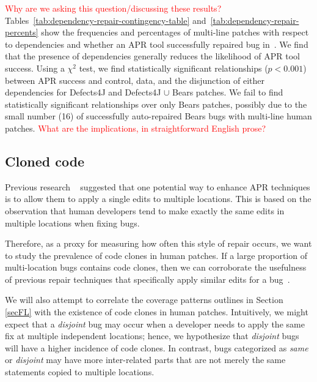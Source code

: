 \documentclass[sigconf, timestamp-false, anonymous=true]{acmart}
\newcommand\todo[1]{\textcolor{red}{#1}}
\begin{document}
\todo{Why are we asking this question/discussing these results?} 
Tables~\ref{tab:dependency-repair-contingency-table} and~\ref{tab:dependency-repair-percents}
show the frequencies and percentages of multi-line patches with respect to dependencies 
and whether an APR tool successfully repaired bug in~\cite{durieux-repair-them-all}.
We find that the presence of dependencies generally reduces the likelihood of APR tool success.
Using a $\chi^2$ test, we find statistically significant relationships ($p < 0.001$)
between APR success and control, data, and the disjunction of either dependencies 
for Defects4J and Defects4J $\cup$ Bears patches. We fail to find statistically 
significant relationships over only Bears patches, possibly due to the small number (16) of 
successfully auto-repaired Bears bugs with multi-line human patches.
\todo{What are the implications, in straightforward English prose?}


\subsection{Cloned code}


Previous research ~\cite{wang2018} suggested that one potential way to enhance
APR techniques is to allow them to apply a single edits to multiple locations.
This is based on the observation that human developers tend to make exactly the 
same edits in multiple locations when fixing bugs. 

Therefore, as a proxy for measuring how often this style of repair occurs, we want to study the
prevalence of code clones in human patches. If a large proportion of multi-location bugs contains code 
clones, then we can corroborate the usefulness of previous repair techniques that specifically apply similar 
edits for a bug~\cite{saha2019harnessing}.

We will also attempt to correlate the coverage patterns outlines in Section \ref{secFL} with the existence of 
code clones in 
human patches. Intuitively, we might expect that a \emph{disjoint} bug may occur when a developer needs 
to apply the same fix at multiple independent locations; hence, we hypothesize that \emph{disjoint} bugs 
will have a higher incidence of code clones. In contrast, bugs categorized as \emph{same} or 
\emph{disjoint} may have more inter-related parts that are not merely the same statements copied to 
multiple locations.
\end{document}

